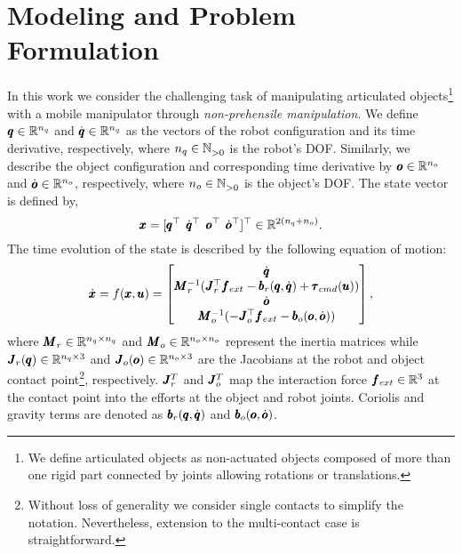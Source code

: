 \section{Modeling and Problem Formulation} \label{sec:formulation}

In this work we consider the challenging task of manipulating articulated objects\footnote{We define articulated objects as non-actuated objects composed of more than one rigid part connected by joints allowing rotations or translations.} with a mobile manipulator through \textit{non-prehensile manipulation}. We define $\pmb{q} \in \mathbb{R}^{n_q}$ and $\dot{\pmb{q}} \in \mathbb{R}^{n_q}$ as the vectors of the robot configuration and its time derivative, respectively, where $n_q \in \mathbb{N}^{}_{>0}$ is the robot's DOF.
Similarly, we describe the object configuration and corresponding time derivative by $\pmb{o} \in \mathbb{R}^{n_o}$ and $\dot{\pmb{o}} \in \mathbb{R}^{n_o}$, respectively, where $n_o \in \mathbb{N}^{}_{>0}$ is the object's DOF. The state vector is defined by,
\begin{equation}
    \pmb{x} = [\pmb{q}^\top \;\, 
      \dot{\pmb{q}}^\top \;\, 
      \pmb{o}^\top \;\,
      \dot{\pmb{o}}^\top ]^\top  \in \mathbb{R}^{2(n_q + n_o)}.
\end{equation}
The time evolution of the state is described by the following equation of motion:
\begin{equation} \label{eq:eom}
    \dot{\pmb{x}} = f(\pmb{x}, \pmb{u}) =  
    \begin{bmatrix}
      \dot{\pmb{q}} \\
      \pmb{M}_r^{-1}(\pmb{J}_{r}^\top \pmb{f}_{ext} - \pmb{b}_{r}(\pmb{q}, \dot{\pmb{q}}) + \pmb{\tau}_{cmd}(\pmb{u})) \\
      \dot{\pmb{o}} \\
      \pmb{M}_o^{-1}(-\pmb{J}_{o}^\top \pmb{f}_{ext} - \pmb{b}_{o}(\pmb{o}, \dot{\pmb{o}}))
    \end{bmatrix},
\end{equation}
where $\pmb{M}_r \in \mathbb{R}^{n_q \times n_q}$ and $\pmb{M}_o \in \mathbb{R}^{n_o \times n_o}$ represent the inertia matrices while $\pmb{J}_r(\pmb{q}) \in \mathbb{R}^{n_q \times 3}$ and $\pmb{J}_o(\pmb{o}) \in \mathbb{R}^{n_o \times 3}$ are the Jacobians at the robot and object contact point\footnote{Without loss of generality we consider single contacts to simplify the notation. Nevertheless, extension to the multi-contact case is straightforward.}, respectively.
$\pmb{J}^T_r$ and $\pmb{J}^T_o$ map the interaction force $\pmb{f}_{ext} \in \mathbb{R}^{3}$ at the contact point into the efforts at the object and robot joints. Coriolis and gravity terms are denoted as $\pmb{b}_{r}(\pmb{q}, \dot{\pmb{q}})$ and $\pmb{b}_{o}(\pmb{o}, \dot{\pmb{o}})$. 


